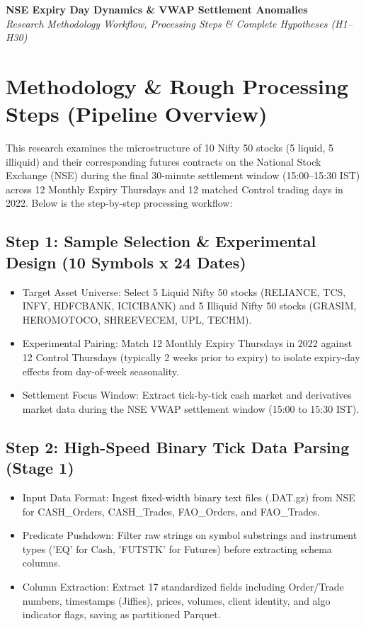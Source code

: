 \documentclass[11pt,a4paper]{article}
\begin{document}
\begin{center}
{\LARGE \textbf{\color{deepnavy} NSE Expiry Day Dynamics \& VWAP Settlement Anomalies}\\[0.4cm]}
{\large \textit{Research Methodology Workflow, Processing Steps \& Complete Hypotheses (H1--H30)}\\[0.5cm]}
\end{center}
\vspace{0.3cm}
\section{Methodology \& Rough Processing Steps (Pipeline Overview)}
This research examines the microstructure of 10 Nifty 50 stocks (5 liquid, 5 illiquid) and their corresponding futures contracts on the National Stock Exchange (NSE) during the final 30-minute settlement window (15:00--15:30 IST) across 12 Monthly Expiry Thursdays and 12 matched Control trading days in 2022. Below is the step-by-step processing workflow:
\vspace{0.2cm}
\subsection*{Step 1: Sample Selection \& Experimental Design (10 Symbols x 24 Dates)}
\begin{itemize}[noitemsep,topsep=2pt]
  \item Target Asset Universe: Select 5 Liquid Nifty 50 stocks (RELIANCE, TCS, INFY, HDFCBANK, ICICIBANK) and 5 Illiquid Nifty 50 stocks (GRASIM, HEROMOTOCO, SHREEVECEM, UPL, TECHM).
  \item Experimental Pairing: Match 12 Monthly Expiry Thursdays in 2022 against 12 Control Thursdays (typically 2 weeks prior to expiry) to isolate expiry-day effects from day-of-week seasonality.
  \item Settlement Focus Window: Extract tick-by-tick cash market and derivatives market data during the NSE VWAP settlement window (15:00 to 15:30 IST).
\end{itemize}
\vspace{0.15cm}
\subsection*{Step 2: High-Speed Binary Tick Data Parsing (Stage 1)}
\begin{itemize}[noitemsep,topsep=2pt]
  \item Input Data Format: Ingest fixed-width binary text files (.DAT.gz) from NSE for CASH\_Orders, CASH\_Trades, FAO\_Orders, and FAO\_Trades.
  \item Predicate Pushdown: Filter raw strings on symbol substrings and instrument types ('EQ' for Cash, 'FUTSTK' for Futures) before extracting schema columns.
  \item Column Extraction: Extract 17 standardized fields including Order/Trade numbers, timestamps (Jiffies), prices, volumes, client identity, and algo indicator flags, saving as partitioned Parquet.
\end{itemize}
\vspace{0.15cm}
\end{document}
